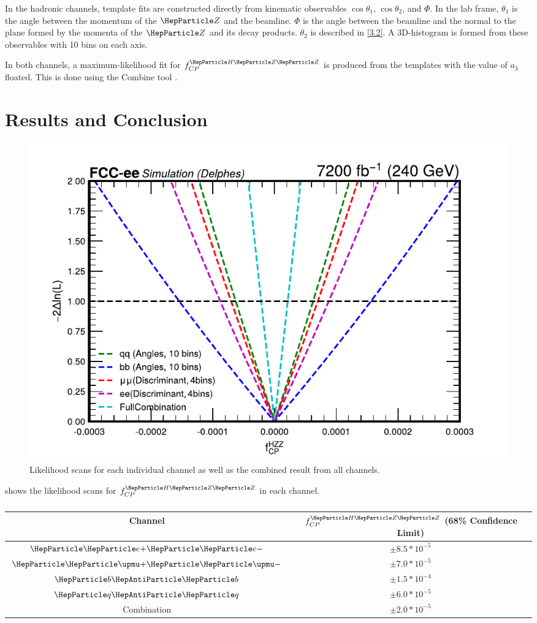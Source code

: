 In the hadronic channels, template fits are constructed directly from kinematic observables $\cos{\theta_1}$, $\cos{\theta_2}$, and $\Phi$. In the lab frame, $\theta_1$ is the angle between the momentum of the $\PZ$ and the beamline. $\Phi$ is the angle between the beamline and the normal to the plane formed by the momenta of the $\PZ$ and its decay products. $\theta_2$ is described in \cref{3.2}. A 3D-histogram is formed from these observables with 10 bins on each axis. 

In both channels, a maximum-likelihood fit for $f^{\PH\PZ\PZ}_{CP}$ is produced from the templates with the value of $a_3$ floated. This is done using the Combine tool \cite{cmscollaboration:2024}. 

\section{Results and Conclusion}

\begin{figure}[]
    \centering
    \includegraphics[width=0.7\linewidth]{full_7200_lumiscan.pdf}
    \caption{Likelihood scans for each individual channel as well as the combined result from all channels.}
    \label{fig:scan}
\end{figure}

  shows the likelihood scans for $f^{\PH\PZ\PZ}_{CP}$ in each channel. 

 \begin{table}[]
     \centering
     \begin{tabular}{cc}
         Channel & $f^{\PH\PZ\PZ}_{CP}$ (68\% Confidence Limit) \\ \hline{}
          $\Pep\Pem$& $\pm 8.5*10^{-5}$ \\
          $\PGmp\PGmm$& $\pm 7.0*10^{-5}$\\
          $\PQb\PAQb$& $\pm 1.5*10^{-4}$\\
          $\PQq\PAQq$& $\pm 6.0*10^{-5}$\\
          Combination& $\pm 2.0*10^{-5}$\\
     \end{tabular}
     \caption{}
     \label{tab:my_label}
 \end{table}